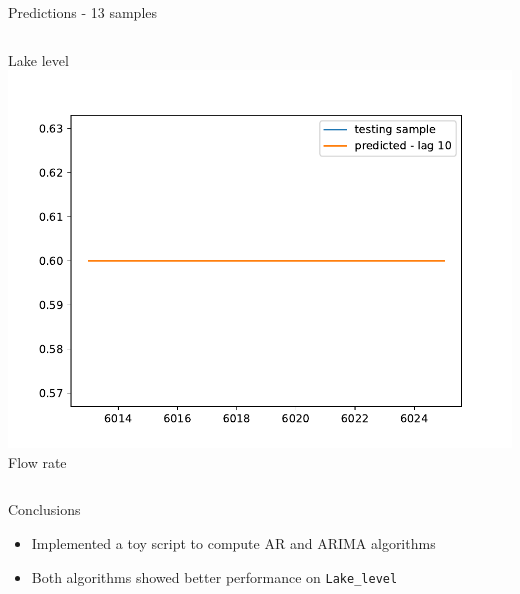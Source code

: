 \documentclass[aspectratio=169, glossy]{beamer}
\begin{document}
\begin{frame}{Predictions - 13 samples}
\begin{columns}
\begin{column}{0.5\columnwidth}
\begin{center}
        \tiny{Lake level}\\
        \vspace{0.5em}
        \includegraphics[width=0.5\columnwidth]{../plots/arima_flow_rate_prediction.pdf}\\
        \tiny{Flow rate}
      \end{center}
    \end{column}
  \end{columns}
\end{frame}

\begin{frame}{Conclusions}
  \begin{itemize}
    \item Implemented a toy script to compute AR and ARIMA algorithms
    \item Both algorithms showed better performance on \texttt{Lake\_level} 
  \end{itemize}
\end{frame}

\end{document}
